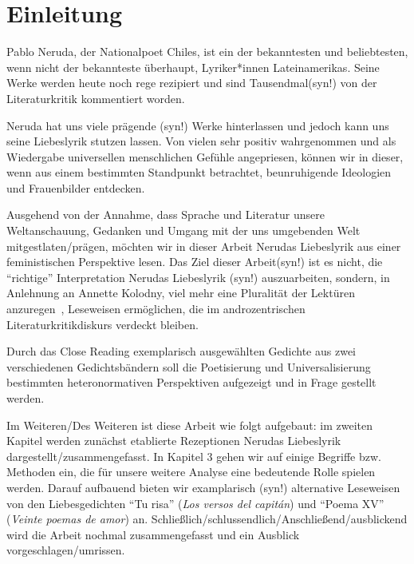 \section{Einleitung}

Pablo Neruda, der Nationalpoet Chiles, ist ein der bekanntesten und beliebtesten, wenn nicht der bekannteste überhaupt, Lyriker*innen Lateinamerikas.
Seine Werke werden heute noch rege rezipiert und sind Tausendmal(syn!) von der Literaturkritik kommentiert worden.


Neruda hat uns viele prägende (syn!) Werke hinterlassen und jedoch kann uns seine Liebeslyrik stutzen lassen.
Von vielen sehr positiv wahrgenommen und als Wiedergabe universellen menschlichen Gefühle angepriesen, können wir in dieser, wenn aus einem bestimmten Standpunkt betrachtet, beunruhigende Ideologien und Frauenbilder entdecken.

Ausgehend von der Annahme, dass Sprache und Literatur unsere Weltanschauung, Gedanken und Umgang mit der uns umgebenden Welt mitgestlaten/prägen,
möchten wir in dieser Arbeit Nerudas Liebeslyrik aus einer feministischen Perspektive lesen.
Das Ziel dieser Arbeit(syn!) ist es nicht, die ``richtige'' Interpretation Nerudas Liebeslyrik (syn!) auszuarbeiten, sondern, in Anlehnung an Annette Kolodny, viel mehr eine Pluralität der Lektüren anzuregen~\autocite{Kolodny1980}, Leseweisen ermöglichen, die im androzentrischen Literaturkritikdiskurs verdeckt bleiben.


\begin{comment}
  * literatur/sprache shape our minds
  * wachsamkeit/Sensibilität schaffen fürs Erkennen patriarchalischen Projekte, die mittels "universelle Gefühle", "schöne Liebeslyrik" vermittelt werden/dafür verkauft werden

  immer noch zu schwammig..
\end{comment}


Durch das Close Reading exemplarisch ausgewählten Gedichte aus zwei verschiedenen Gedichtsbändern soll die Poetisierung und Universalisierung bestimmten heteronormativen Perspektiven aufgezeigt und in Frage gestellt werden.

Im Weiteren/Des Weiteren ist diese Arbeit wie folgt aufgebaut: im zweiten Kapitel werden zunächst etablierte Rezeptionen Nerudas Liebeslyrik dargestellt/zusammengefasst.
In Kapitel 3 gehen wir auf einige Begriffe bzw. Methoden ein, die für unsere weitere Analyse eine bedeutende Rolle spielen werden.
Darauf aufbauend bieten wir examplarisch (syn!) alternative Leseweisen von den Liebesgedichten ``Tu risa'' (\textit{Los versos del capitán}) und ``Poema XV'' (\textit{Veinte poemas de amor}) an.
Schließlich/schlussendlich/Anschließend/ausblickend wird die Arbeit nochmal zusammengefasst und ein Ausblick vorgeschlagen/umrissen.


